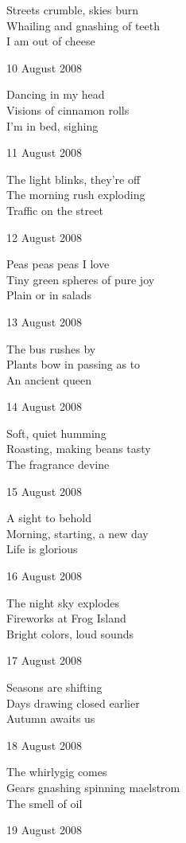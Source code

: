 \documentclass[12pt]{article}
\begin{document}
Streets crumble, skies burn \\
Whailing and gnashing of teeth \\
I am out of cheese
 

\newpage

10 August 2008

Dancing in my head \\
Visions of cinnamon rolls \\
I'm in bed, sighing

11 August 2008

The light blinks, they're off \\
The morning rush exploding \\
Traffic on the street

12 August 2008

Peas peas peas I love \\
Tiny green spheres of pure joy \\
Plain or in salads

13 August 2008

The bus rushes by \\
Plants bow in passing as to \\
An ancient queen

14 August 2008

Soft, quiet humming \\
Roasting, making beans tasty \\
The fragrance devine

15 August 2008

A sight to behold \\
Morning, starting, a new day \\
Life is glorious

16 August 2008

The night sky explodes \\
Fireworks at Frog Island \\
Bright colors, loud sounds

\newpage

17 August 2008

Seasons are shifting \\
Days drawing closed earlier \\
Autumn awaits us

18 August 2008

The whirlygig comes \\
Gears gnashing spinning maelstrom \\
The smell of oil

19 August 2008
\end{document}
